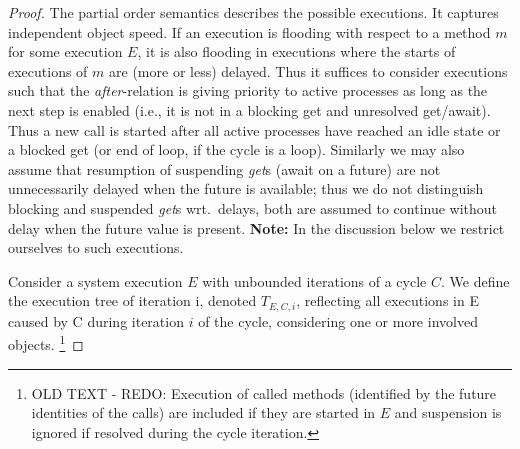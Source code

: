 {\begin{proof}
The partial order semantics describes the possible
executions.  It captures independent object speed.  If an execution is
flooding with respect to a method $m$ for some execution $E$, it is
also flooding in executions where the starts of executions of $m$ are
 (more or less) delayed.  
  Thus it suffices to consider executions such that
the \emph{after}-relation is giving priority to active processes as long as
the next step is enabled (i.e., it is not in a blocking get and
unresolved get/await).  Thus a new call is started after all active
processes have reached an idle state or a blocked get (or end of loop,
if the cycle is a loop).
Similarly
we may also assume that resumption of suspending \emph{get}s  (await on a
future) are not unnecessarily delayed when the future is available;
thus we do not distinguish blocking and suspended \emph{get}s  wrt.\ delays,
both are assumed to continue without delay when the future value is
present. \textbf{Note:} In the discussion below we restrict ourselves to such 
executions.



Consider a system execution  $E$ with unbounded iterations of a cycle $C$.
We define the execution tree of iteration i, denoted $T_{E,C,i}$, reflecting 
all executions in E caused by C during  iteration $i$ of the cycle, 
considering one or more involved objects.
\footnote{OLD TEXT  - REDO:
 Execution of called methods (identified by the future identities  of the calls) are included if they are started 
 in $E$
and suspension is ignored if resolved during the cycle iteration.}
 

\end{proof}}
